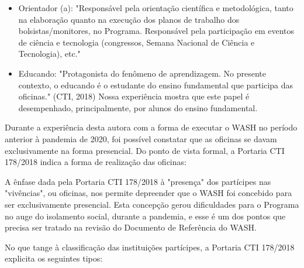 \begin{itemize}
\item Orientador (a): "Responsável pela orientação científica e metodológica, tanto na elaboração quanto na execução dos planos de trabalho dos bolsistas/monitores, no Programa. Responsável pela participação em eventos de ciência e tecnologia (congressos, Semana Nacional de Ciência e Tecnologia), etc."
\item Educando: "Protagonista do fenômeno de aprendizagem. No presente contexto, o educando é o estudante do ensino fundamental que participa das oficinas." (CTI, 2018) Nossa experiência mostra que este papel é desempenhado, principalmente, por alunos do ensino fundamental.
\end{itemize}

Durante a experiência desta autora com a forma de executar o WASH no período anterior à pandemia de 2020, foi possível constatar que as oficinas se davam exclusivamente na forma presencial. Do ponto de vista formal, a Portaria CTI 178/2018 indica  a forma de realização das oficinas:


\noindent\begin{center}\mbox{\centering{}}\end{center}


A ênfase dada pela Portaria CTI 178/2018 à "presença" dos partícipes nas "vivências", ou oficinas, nos permite depreender que o WASH foi concebido para ser exclusivamente presencial. Esta concepção gerou dificuldades para o Programa no auge do isolamento social, durante a pandemia, e esse é um dos pontos que precisa ser tratado na revisão do Documento de Referência do WASH.

No que tange à classificação das instituições partícipes, a Portaria CTI 178/2018 explicita os seguintes tipos:


